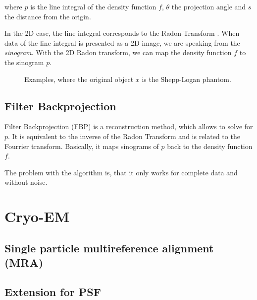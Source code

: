 where $p$ is the line integral of the density function $f$, $\theta$ the projection angle and $s$ the distance from the origin.

In the 2D case, the line integral corresponds to the Radon-Transform \cite{radonTransform}.
When data of the line integral is presented as a 2D image, we are speaking from the \textit{sinogram}.
With the 2D Radon transform, we can map the density function $f$ to the sinogram $p$. 

\begin{figure}
    \centering
    \caption{Examples, where the original object $x$ is the Shepp-Logan phantom.}
    \label{fig:phantom}
\end{figure}

\subsection{Filter Backprojection}
\label{sec:filterBackProjection}
Filter Backprojection (FBP) is a reconstruction method, which allows to solve for $p$. It is equivalent to the inverse of the Radon Transform
and is related to the Fourrier transform. Basically, it maps sinograms of $p$ back to the density function $f$.

The problem with the algorithm is, that it only works for complete data and without noise.



\section{Cryo-EM}


\subsection{Single particle multireference alignment (MRA)}


\subsection{Extension for PSF}


